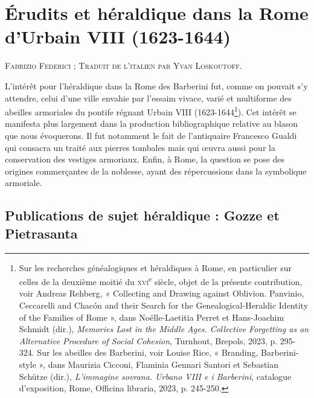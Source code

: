 \documentclass[12pt,twoside,openany]{book}
\newcommand{\PurhContributors}[1]{%
  \par\vspace{0.5\baselineskip}%
  {\normalsize\scshape #1\par}%
  \vspace{0.6\baselineskip}%
}
\begin{document}
\chapter{Érudits et héraldique dans la Rome d’Urbain VIII (1623-1644)}

\PurhContributors{Fabrizio Federici ; Traduit de l’italien par Yvan Loskoutoff.}

L’intérêt pour l’héraldique dans la Rome des Barberini fut, comme on pouvait s’y attendre, celui d’une ville envahie par l’essaim vivace, varié et multiforme des abeilles armoriales du pontife régnant Urbain VIII (1623-1644\footnote{Sur les recherches généalogiques et héraldiques à Rome, en particulier sur celles de la deuxième moitié du \textsc{xvi}\textsuperscript{e} siècle, objet de la présente contribution, voir Andreas Rehberg\textit{, }« Collecting and Drawing against Oblivion. Panvinio, Ceccarelli and Chacón and their Search for the Genealogical-Heraldic Identity of the Families of Rome », dans Noëlle-Laetitia Perret et Hans-Joachim Schmidt (dir.), \textit{Memories Lost in the Middle Ages. Collective Forgetting as an Alternative Procedure of Social Cohesion}, Turnhout, Brepols, 2023, p. 295-324. Sur les abeilles des Barberini, voir Louise Rice, « Branding, Barberini-style », dans Maurizia Cicconi, Flaminia Gennari Santori et Sebastian Schütze (dir.), \textit{L’immagine sovrana. Urbano VIII e i Barberini}, catalogue d’exposition, Rome, Officina libraria, 2023, p. 245-250.}). Cet intérêt se manifesta plus largement dans la production bibliographique relative au blason que nous évoquerons. Il fut notamment le fait de l’antiquaire Francesco Gualdi qui consacra un traité aux pierres tombales mais qui œuvra aussi pour la conservation des vestiges armoriaux. Enfin, à Rome, la question se pose des origines commerçantes de la noblesse, ayant des répercussions dans la symbolique armoriale.

\section{Publications de sujet héraldique : Gozze et Pietrasanta}
\end{document}
